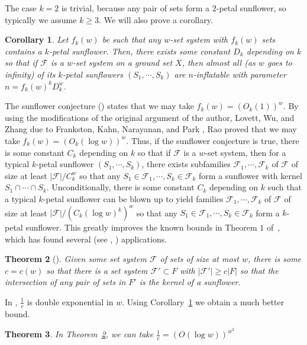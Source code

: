 \documentclass[12pt]{article}
\newtheorem{theorem}{Theorem}[section]
\newtheorem{corollary}[theorem]{Corollary}
\newcommand{\F}{\mathcal{F}}
\begin{document}
The case $k=2$ is trivial, because any pair of sets form a $2$-petal sunflower, so typically we assume $k \ge 3$.  We will also prove a corollary.

\begin{corollary}
\label{corollary:sf}
	Let $f_k(w)$ be such that any $w$-set system with $f_k(w)$ sets contains a $k$-petal sunflower. Then, there exists some constant $D_k$ depending on $k$ so that if $\F$ is a $w$-set system on a ground set $X$, then almost all (as $w$ goes to infinity) of its $k$-petal sunflowers $(S_1, \cdots, S_k)$ are $n$-inflatable with parameter $n=f_k(w)^kD_k^w$.
\end{corollary}

The sunflower conjecture (\cite{ErdosR1960}) states that we may take $f_k(w)=(O_k(1))^w$. By using the modifications of the original argument of the author, Lovett, Wu, and Zhang \cite{alwz} due to Frankston, Kahn, Narayanan, and Park \cite{fknp}, Rao \cite{rao2019coding} proved that we may take $f_k(w)=(O_k(\log w))^w$. Thus, if the sunflower conjecture is true, there is some constant $C_k$ depending on $k$ so that if $\F$ is a $w$-set system, then for a typical $k$-petal sunflower $(S_1, \cdots, S_k)$, there exists subfamilies $\F_1, \cdots, \F_k$ of $\F$ of size at least $|\F|/C_k^w$ so that any $S_1 \in \F_1, \cdots, S_k \in \F_k$ form a sunflower with kernel $S_1 \cap \cdots \cap S_k$. Unconditionally, there is some constant $C_k$ depending on $k$ such that a typical $k$-petal sunflower can be blown up to yield families $\F_1, \cdots, \F_k$ of $\F$ of size at least $|\F|/(C_k(\log w)^k)^w$ so that any $S_1 \in \F_1, \cdots, S_k \in \F_k$ form a $k$-petal sunflower.  \iffalse This greatly improves the known bounds in Theorem $1$ of~\cite{fursun}, which has found several (see \cite{ff2}, \cite{ff1}) applications.

\begin{theorem}[\cite{fursun}]
\label{thm:furedi}
	Given some set system $\F$ of sets of size at most $w$, there is some $c=c(w)$ so that there is a set system $\F' \subset F$ with $|\F'| \ge c|F|$ so that the intersection of any pair of sets in $F'$ is the kernel of a sunflower.
\end{theorem}

In \cite{fursun}, $\frac{1}{c}$ is double exponential in $w$.  Using Corollary~\ref{corollary:sf} we obtain a much better bound.

\begin{theorem} In Theorem~\ref{thm:furedi}, we can take $\frac{1}{c}=(O(\log w))^{w^2}$
\end{theorem}
\end{document}
